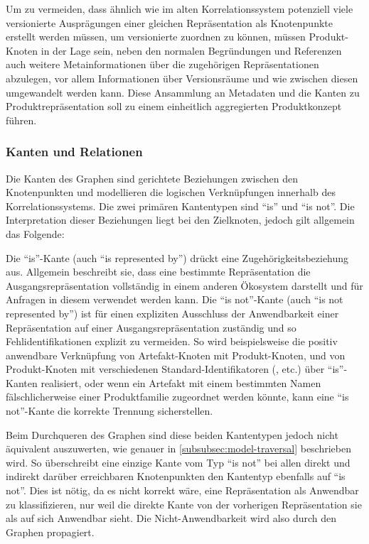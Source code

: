 Um zu vermeiden, dass ähnlich wie im alten Korrelationssystem potenziell viele versionierte Ausprägungen einer gleichen Repräsentation als Knotenpunkte erstellt werden müssen, um versionierte  zuordnen zu können, müssen Produkt-Knoten in der Lage sein, neben den normalen Begründungen und Referenzen auch weitere Metainformationen über die zugehörigen Repräsentationen abzulegen, vor allem Informationen über Versionsräume und wie zwischen diesen umgewandelt werden kann.
Diese Ansammlung an Metadaten und die Kanten zu Produktrepräsentation soll zu einem einheitlich aggregierten Produktkonzept führen.

\subsubsection{Kanten und Relationen}\label{subsubsec:model-edges-relations}
Die Kanten des Graphen sind gerichtete Beziehungen zwischen den Knotenpunkten und modellieren die logischen Verknüpfungen innerhalb des Korrelationssystems.
Die zwei primären Kantentypen sind \enquote{is} und \enquote{is not}.
Die Interpretation dieser Beziehungen liegt bei den Zielknoten, jedoch gilt allgemein das Folgende:

Die \enquote{is}-Kante (auch \enquote{is represented by}) drückt eine Zugehörigkeitsbeziehung aus.
Allgemein beschreibt sie, dass eine bestimmte Repräsentation die Ausgangsrepräsentation vollständig in einem anderen Ökosystem darstellt und für Anfragen in diesem verwendet werden kann.
Die \enquote{is not}-Kante (auch \enquote{is not represented by}) ist für einen expliziten Ausschluss der Anwendbarkeit einer Repräsentation auf einer Ausgangsrepräsentation zuständig und so Fehlidentifikationen explizit zu vermeiden.
So wird beispielsweise die positiv anwendbare Verknüpfung von Artefakt-Knoten mit Produkt-Knoten, und von Produkt-Knoten mit verschiedenen Standard-Identifikatoren (,  etc.) über \enquote{is}-Kanten realisiert, oder wenn ein Artefakt mit einem bestimmten Namen fälschlicherweise einer Produktfamilie zugeordnet werden könnte, kann eine \enquote{is not}-Kante die korrekte Trennung sicherstellen.

Beim Durchqueren des Graphen sind diese beiden Kantentypen jedoch nicht äquivalent auszuwerten, wie genauer in \autoref{subsubsec:model-traversal} beschrieben wird.
So überschreibt eine einzige Kante vom Typ \enquote{is not} bei allen direkt und indirekt darüber erreichbaren Knotenpunkten den Kantentyp ebenfalls auf \enquote{is not}.
Dies ist nötig, da es nicht korrekt wäre, eine Repräsentation als Anwendbar zu klassifizieren, nur weil die direkte Kante von der vorherigen Repräsentation sie als auf sich Anwendbar sieht.
Die Nicht-Anwendbarkeit wird also durch den Graphen propagiert.

